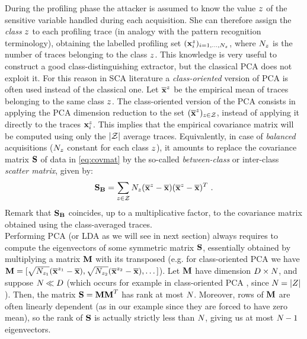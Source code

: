 During the profiling phase the attacker is assumed to know the value $\sensVar$ of the sensitive variable handled during each acquisition. She can therefore assign the {\em class} $\sensVar$ to each profiling trace  (in analogy with the pattern recognition terminology), obtaining the labelled profiling set $(\sss{i})_{i=1,\dots,\numTraces}$, where $\numTraces$ is the number of traces belonging to the class $\sensVar$. This knowledge is very useful to construct a good class-distinguishing extractor, but the classical PCA does not exploit it. For this reason in SCA literature \cite{TAprincipal,choudaryefficient,choudary2014efficient,disassembler,Standaert2008}  a {\em class-oriented} version of PCA is often used instead of the classical one. Let $\mmmXclass$ be the empirical mean of traces belonging to the same class $\sensVar$. The class-oriented version of the PCA  consists in applying the PCA dimension reduction to the set $(\mmmXclass)_{\sensVar \in \sensVarSet}$, instead of applying it directly to the traces $\sss{i}$. This implies that the empirical covariance matrix will be computed using only the $\lvert \sensVarSet \rvert$ average traces. Equivalently, in case of \textit{balanced} acquisitions ($\numTraces$ constant for each class $\sensVar$), it amounts to replace the covariance matrix $\covmat$ of data in \eqref{eq:covmat}  by the so-called {\em between-class} or inter-class {\em scatter matrix}, given by:
\begin{equation}\label{eq:SB}
\SB = \sum_{\sensVar\in\sensVarSet}\numTraces(\mmmXclass-\mmmX)(\mmmXclass-\mmmX)^T \mbox{ .}
\end{equation}
Remark that $\SB$ coincides, up to a multiplicative factor, to the covariance matrix obtained using the class-averaged traces.\\

Performing PCA (or LDA as we will see in next section) always requires to compute the eigenvectors of some symmetric matrix $\covmat$, essentially obtained by multiplying a matrix $\measuresMatrix$ with its transposed (e.g. for class-oriented PCA we have $\measuresMatrix = [\sqrt{\numTraces[\sensVar_1]}(\mmmXclass[\sensVar_1]-\mmmX),\sqrt{\numTraces[\sensVar_2]}(\mmmXclass[\sensVar_2]-\mmmX), \dots ]$). Let $\measuresMatrix$ have dimension $\traceLength\times\numTraces[]$, and suppose $\numTraces[]\ll \traceLength$ (which occurs for example in class-oriented PCA , since $\numTraces[]=\lvert \sensRandVar \rvert$). Then, the matrix $\covmat=\measuresMatrix\measuresMatrix^T$ has rank at most $\numTraces[]$. Moreover, rows of $\measuresMatrix$ are often linearly dependent (as in our example since they are forced to have zero mean), so the rank of $\covmat$ is actually strictly less than $\numTraces[]$, giving us at most $\numTraces[]-1$ eigenvectors.\\

